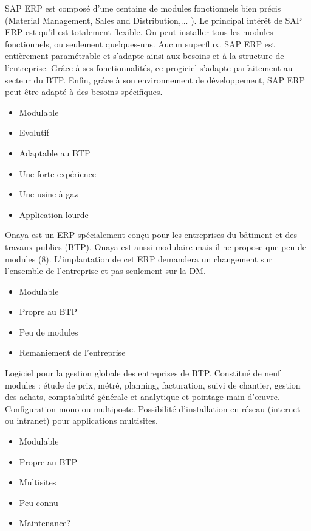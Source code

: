 {
SAP ERP est composé d'une centaine de modules fonctionnels bien précis (Material Management, Sales and Distribution,... ).
Le principal intérêt de SAP ERP est qu'il est totalement flexible. On peut installer tous les modules fonctionnels, ou seulement quelques-uns.
Aucun superflux. SAP ERP est entièrement paramétrable et s'adapte ainsi aux besoins et à la structure de l'entreprise.
Grâce à ses fonctionnalités, ce progiciel s'adapte parfaitement au secteur du BTP.
Enfin, grâce à son environnement de développement, SAP ERP peut être adapté à des besoins spécifiques.
}
{
    \begin{itemize}
        \item Modulable
        \item Evolutif
        \item Adaptable au BTP
        \item Une forte expérience
    \end{itemize}
}
{
    \begin{itemize}
        \item Une usine à gaz
        \item Application lourde
    \end{itemize}
}

 
 
{
Onaya est un ERP spécialement conçu pour les entreprises du bâtiment et des travaux publics (BTP).
Onaya est aussi modulaire mais il ne propose que peu de modules (8).
L'implantation de cet ERP demandera un changement sur l'ensemble de l'entreprise et pas seulement sur la DM.
}
{
    \begin{itemize}
        \item Modulable
        \item Propre au BTP
    \end{itemize}
}
{
    \begin{itemize}
        \item Peu de modules
        \item Remaniement de l'entreprise
    \end{itemize}
}

{
Logiciel pour la gestion globale des entreprises de BTP. Constitué de neuf modules : étude de prix, métré, planning, facturation, suivi de chantier, gestion des achats, comptabilité générale et analytique et pointage main d'\oe uvre.
Configuration mono ou multiposte. Possibilité d'installation en réseau (internet ou intranet) pour applications multisites.
}
{
    \begin{itemize}
      \item Modulable
      \item Propre au BTP
      \item Multisites
    \end{itemize}
}
{
    \begin{itemize}
        \item Peu connu
        \item Maintenance?
    \end{itemize}
}

